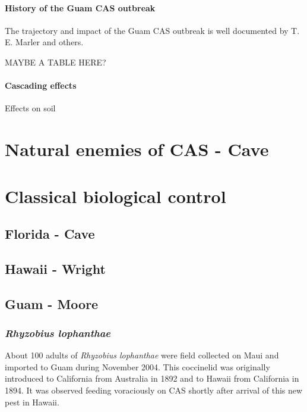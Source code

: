 \documentclass[12pt,letterpaper,english,bibliography=totocnumbered, abstract=on]{scrartcl}
\begin{document}
\paragraph{History of the Guam CAS outbreak}

The trajectory and impact of the Guam CAS outbreak is well documented by T. E. Marler and others.

MAYBE A TABLE HERE?

\paragraph{Cascading effects}

\cite{haynesExoticInvasivePest2005}

Effects on soil \cite{marlerTwoCycadSpecies2020}

\section{Natural enemies of CAS - Cave}

\section{Classical biological control}

\subsection{Florida - Cave}

\subsection{Hawaii - Wright}

\subsection{Guam - Moore}

\subsubsection{\textit{Rhyzobius lophanthae}}

About 100 adults of \textit{Rhyzobius lophanthae} were field collected on Maui and imported to Guam during November 2004. This coccinelid was originally 
introduced to California from Australia in 1892 and to Hawaii from California in 1894. It was observed feeding voraciously on CAS shortly after arrival of this new pest in Hawaii. 
\end{document}
